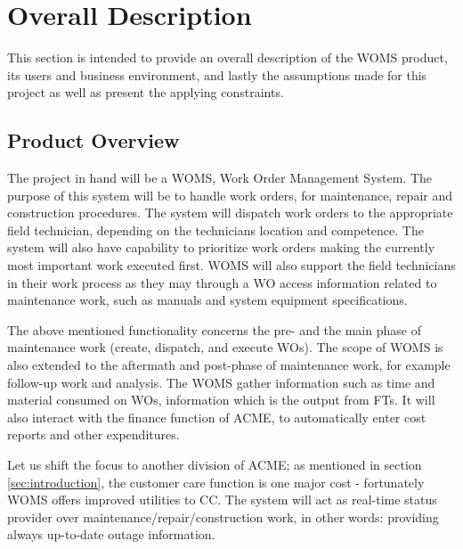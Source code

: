 \section{Overall Description}
\label{sec:overall_description}
This section is intended to provide an overall description of the WOMS product, its users and business environment, and lastly the assumptions made for this project as well as present the applying constraints.
\subsection{Product Overview}
The project in hand will be a WOMS, Work Order Management System.  The purpose of this system will be to handle work orders, for maintenance, repair and construction procedures. The system will dispatch work orders to the appropriate field technician, depending on the technicians location and competence. The system will also have capability to prioritize  work orders  making the currently  most important work executed first. WOMS will also support the field technicians in their work process as they may through a WO access information related to maintenance work, such as manuals and system equipment specifications. 

The above mentioned functionality concerns the pre- and the main phase of maintenance work (create, dispatch, and execute WOs). The scope of WOMS is also extended to the aftermath and post-phase of maintenance work, for example follow-up work and analysis. The WOMS gather information such as time and material consumed on WOs, information which is the output from FTs. It will also interact with the finance function of ACME, to automatically enter cost reports and other expenditures. 

Let us shift the focus to another division of ACME; as mentioned in section \ref{sec:introduction}, the customer care function is one major cost - fortunately WOMS offers improved utilities to CC. The system will act as real-time status provider over maintenance/repair/construction work, in other words: providing always up-to-date outage information. 

